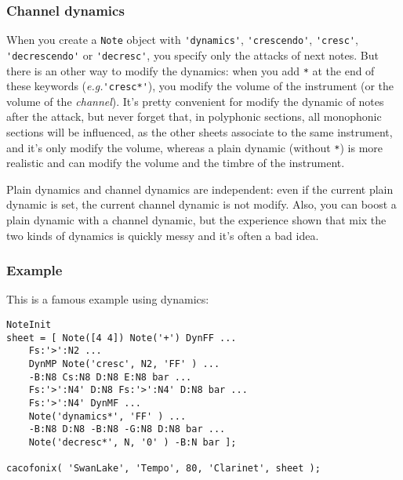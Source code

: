 \documentclass{article}
\newcommand\eg{\emph{e.g.}\xspace}
\begin{document}
\subsubsection{Channel dynamics}
\label{sec:ChannelDynamics}

When you create a \lstinline!Note! object with \lstinline!'dynamics'!, \lstinline!'crescendo'!, \lstinline!'cresc'!, \lstinline!'decrescendo'! or \lstinline!'decresc'!, you specify only the attacks of next notes. But there is an other way to modify the dynamics: when you add \lstinline!*! at the end of these keywords (\eg \lstinline!'cresc*'!), you modify the volume of the instrument (or the volume of the \emph{channel}). It's pretty convenient for modify the dynamic of notes after the attack, but never forget that, in polyphonic sections, all monophonic sections will be influenced, as the other sheets associate to the same instrument, and it's only modify the volume, whereas a plain dynamic (without \lstinline!*!) is more realistic and can modify the volume and the timbre of the instrument.

Plain dynamics and channel dynamics are independent: even if the current plain dynamic is set, the current channel dynamic is not modify. Also, you can boost a plain dynamic with a channel dynamic, but the experience shown that mix the two kinds of dynamics is quickly messy and it's often a bad idea.

\subsubsection{Example}

This is a famous example using dynamics: \\

\begin{lstlisting}
NoteInit
sheet = [ Note([4 4]) Note('+') DynFF ...
	Fs:'>':N2 ...
	DynMP Note('cresc', N2, 'FF' ) ...
	-B:N8 Cs:N8 D:N8 E:N8 bar ...
	Fs:'>':N4' D:N8 Fs:'>':N4' D:N8 bar ...
	Fs:'>':N4' DynMF ...
	Note('dynamics*', 'FF' ) ...
	-B:N8 D:N8 -B:N8 -G:N8 D:N8 bar ...
	Note('decresc*', N, '0' ) -B:N bar ];

cacofonix( 'SwanLake', 'Tempo', 80, 'Clarinet', sheet );
\end{lstlisting}
\end{document}
